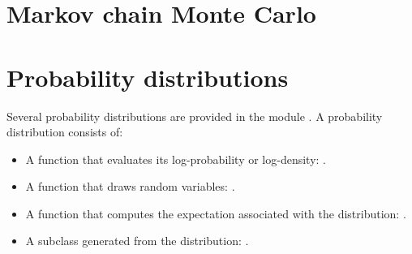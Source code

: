 \documentclass[]{jss_mod}
\begin{document}
\appendix
\section[MCMC]{Markov chain Monte Carlo} 
\label{sec:MCMC} 


\section[Distributions]{Probability distributions} 
\label{sec:distributions}
Several probability distributions are provided in the module . A probability distribution consists of:
\begin{itemize}
    \item A function that evaluates its log-probability or log-density: .
    \item A function that draws random variables: .
    \item A function that computes the expectation associated with the distribution: .
    \item A  subclass generated from the distribution: .
\end{itemize} 


\nocite{Bernardo:1992fk}

\end{document}

